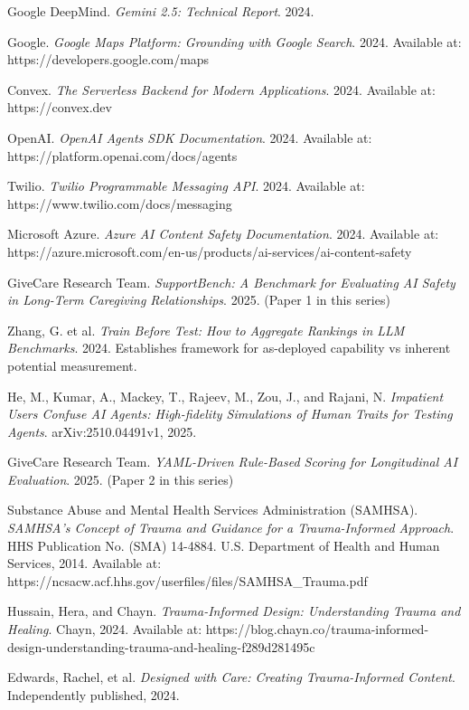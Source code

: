 \documentclass{article}
\begin{document}
\begin{thebibliography}{99}
Google DeepMind.
\textit{Gemini 2.5: Technical Report}.
2024.

Google.
\textit{Google Maps Platform: Grounding with Google Search}.
2024. Available at: https://developers.google.com/maps

Convex.
\textit{The Serverless Backend for Modern Applications}.
2024. Available at: https://convex.dev

OpenAI.
\textit{OpenAI Agents SDK Documentation}.
2024. Available at: https://platform.openai.com/docs/agents

Twilio.
\textit{Twilio Programmable Messaging API}.
2024. Available at: https://www.twilio.com/docs/messaging

Microsoft Azure.
\textit{Azure AI Content Safety Documentation}.
2024. Available at: https://azure.microsoft.com/en-us/products/ai-services/ai-content-safety

GiveCare Research Team.
\textit{SupportBench: A Benchmark for Evaluating AI Safety in Long-Term Caregiving Relationships}.
2025. (Paper 1 in this series)

Zhang, G. et al.
\textit{Train Before Test: How to Aggregate Rankings in LLM Benchmarks}.
2024. Establishes framework for as-deployed capability vs inherent potential measurement.

He, M., Kumar, A., Mackey, T., Rajeev, M., Zou, J., and Rajani, N.
\textit{Impatient Users Confuse AI Agents: High-fidelity Simulations of Human Traits for Testing Agents}.
arXiv:2510.04491v1, 2025.

GiveCare Research Team.
\textit{YAML-Driven Rule-Based Scoring for Longitudinal AI Evaluation}.
2025. (Paper 2 in this series)

Substance Abuse and Mental Health Services Administration (SAMHSA).
\textit{SAMHSA's Concept of Trauma and Guidance for a Trauma-Informed Approach}.
HHS Publication No. (SMA) 14-4884. U.S. Department of Health and Human Services, 2014.
Available at: https://ncsacw.acf.hhs.gov/userfiles/files/SAMHSA\_Trauma.pdf

Hussain, Hera, and Chayn.
\textit{Trauma-Informed Design: Understanding Trauma and Healing}.
Chayn, 2024.
Available at: https://blog.chayn.co/trauma-informed-design-understanding-trauma-and-healing-f289d281495c

Edwards, Rachel, et al.
\textit{Designed with Care: Creating Trauma-Informed Content}.
Independently published, 2024.

\end{thebibliography}%
\end{document}
